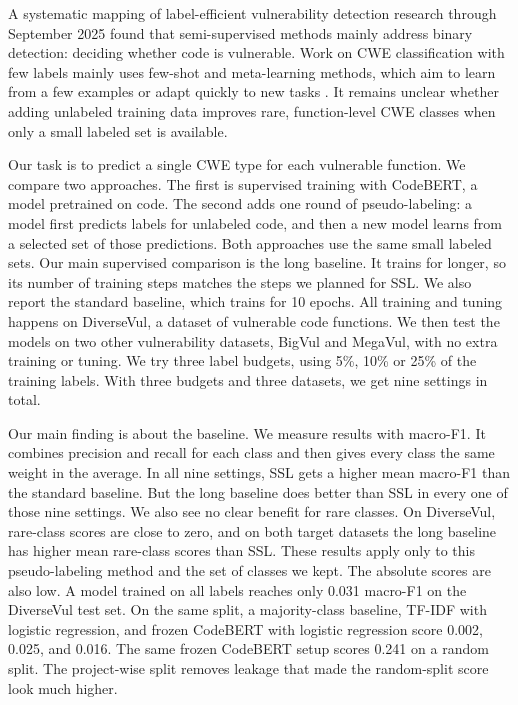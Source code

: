 \documentclass[conference]{IEEEtran}
\begin{document}
A systematic mapping of label-efficient vulnerability detection research
through September 2025 found that semi-supervised methods mainly address
binary detection: deciding whether code is vulnerable. Work on CWE
classification with few labels mainly uses few-shot and meta-learning
methods, which aim to learn from a few examples or adapt quickly to new
tasks \cite{khalal2026labels}. It remains unclear whether adding
unlabeled training data improves rare, function-level CWE classes when
only a small labeled set is available.

Our task is to predict a single CWE type for each vulnerable function.
We compare two approaches. The first is supervised training with
CodeBERT, a model pretrained on code. The second adds one round of
pseudo-labeling: a model first predicts labels for unlabeled code, and
then a new model learns from a selected set of those predictions. Both
approaches use the same small labeled sets. Our main supervised
comparison is the long baseline. It trains for longer, so its number of
training steps matches the steps we planned for SSL. We also report the
standard baseline, which trains for 10 epochs. All training and tuning
happens on DiverseVul, a dataset of vulnerable code functions. We then
test the models on two other vulnerability datasets, BigVul and MegaVul,
with no extra training or tuning. We try three label budgets, using 5\%,
10\% or 25\% of the training labels. With three budgets and three
datasets, we get nine settings in total.

Our main finding is about the baseline. We measure results with
macro-F1. It combines precision and recall for each class and then gives
every class the same weight in the average. In all nine settings, SSL
gets a higher mean macro-F1 than the standard baseline. But the long
baseline does better than SSL in every one of those nine settings. We
also see no clear benefit for rare classes. On DiverseVul, rare-class
scores are close to zero, and on both target datasets the long baseline
has higher mean rare-class scores than SSL. These results apply only to
this pseudo-labeling method and the set of classes we kept.
The absolute scores are also low. A model trained on all labels reaches only 0.031 macro-F1 on the DiverseVul test set. On the same split, a majority-class baseline, TF-IDF with logistic regression, and frozen CodeBERT with logistic regression score 0.002, 0.025, and 0.016. The same frozen CodeBERT setup scores 0.241 on a random split. The project-wise split removes leakage that made the random-split score look much higher.
\end{document}
